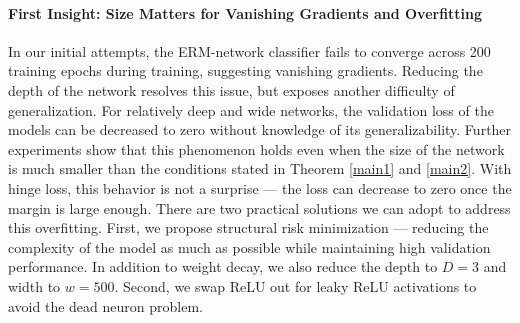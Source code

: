 \documentclass{article}
\begin{document}
\paragraph*{First Insight: Size Matters for Vanishing Gradients and Overfitting}
In our initial attempts, the ERM-network classifier fails to converge across 200 training epochs during training, suggesting vanishing gradients.
Reducing the depth of the network resolves this issue, but exposes another difficulty of generalization.
For relatively deep and wide networks, the validation loss of the models can be decreased to zero without knowledge of its generalizability.
Further experiments show that this phenomenon holds even when the size of the network is much smaller than the conditions stated in Theorem \ref{main1} and \ref{main2}.
With hinge loss, this behavior is not a surprise --- the loss can decrease to zero once the margin is large enough.
There are two practical solutions we can adopt to address this overfitting.
First, we propose structural risk minimization --- reducing the complexity of the model as much as possible while maintaining high validation performance.
In addition to weight decay, we also reduce the depth to $D=3$ and width to $w=500$.
Second, we swap ReLU out for leaky ReLU activations to avoid the dead neuron problem.
\end{document}
